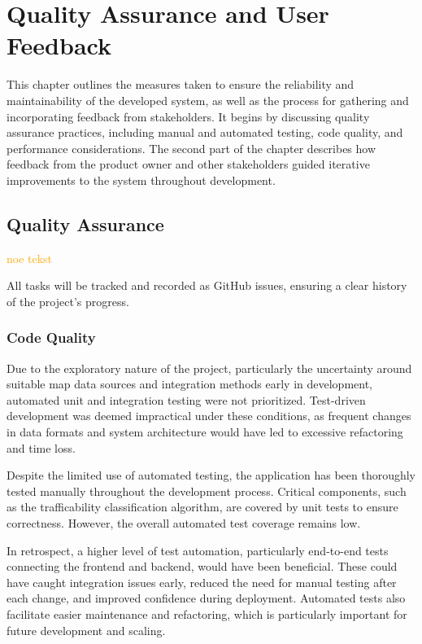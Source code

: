 \chapter{Quality Assurance and User Feedback}\label{chap:qualityassuranceanduserfeedback}

This chapter outlines the measures taken to ensure the reliability and maintainability of the developed system, as well as the process for gathering and incorporating feedback from stakeholders. It begins by discussing quality assurance practices, including manual and automated testing, code quality, and performance considerations. The second part of the chapter describes how feedback from the product owner and other stakeholders guided iterative improvements to the system throughout development.

\section{Quality Assurance}

\textcolor{orange}{noe tekst}

All tasks will be tracked and recorded as GitHub issues, ensuring a clear
history of the project's progress. 

\subsection{Code Quality} %

Due to the exploratory nature of the project, particularly the uncertainty around suitable map data sources and integration methods early in development, automated unit and integration testing were not prioritized. Test-driven development was deemed impractical under these conditions, as frequent changes in data formats and system architecture would have led to excessive refactoring and time loss.

Despite the limited use of automated testing, the application has been thoroughly tested manually throughout the development process. Critical components, such as the trafficability classification algorithm, are covered by unit tests to ensure correctness. However, the overall automated test coverage remains low.

In retrospect, a higher level of test automation, particularly end-to-end tests connecting the frontend and backend, would have been beneficial. These could have caught integration issues early, reduced the need for manual testing after each change, and improved confidence during deployment. Automated tests also facilitate easier maintenance and refactoring, which is particularly important for future development and scaling.

